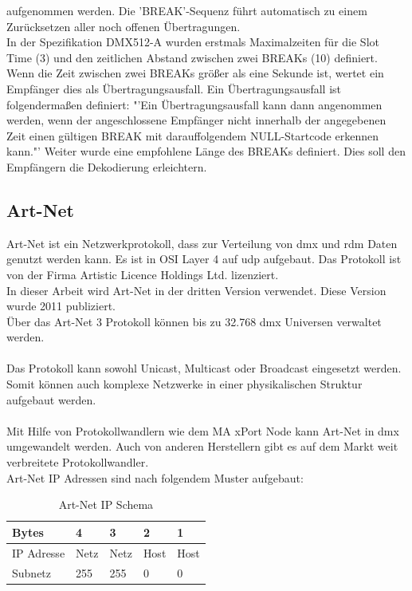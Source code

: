 \documentclass[11pt]{scrartcl}
\begin{document}
aufgenommen werden. Die 'BREAK'-Sequenz führt automatisch zu einem Zurücksetzen aller noch
offenen Übertragungen.\\
In der Spezifikation DMX512-A wurden erstmals Maximalzeiten für die Slot Time (3) und den
zeitlichen Abstand zwischen zwei BREAKs (10) definiert. Wenn die Zeit zwischen zwei BREAKs größer
als eine Sekunde ist, wertet ein Empfänger dies als Übertragungsausfall. Ein Übertragungsausfall ist
folgendermaßen definiert: "'Ein Übertragungsausfall kann dann angenommen werden, wenn der
angeschlossene Empfänger nicht innerhalb der angegebenen Zeit einen gültigen BREAK mit
darauffolgendem NULL-Startcode erkennen kann."' \cite{dmxstandard} Weiter wurde eine empfohlene Länge
des BREAKs definiert. Dies soll den Empfängern die Dekodierung erleichtern.
\clearpage

\subsection{Art-Net}
Art-Net ist ein Netzwerkprotokoll, dass zur Verteilung von \ac{dmx} und \ac{rdm} Daten genutzt werden kann.
Es ist in OSI Layer 4 auf \ac{udp} aufgebaut. Das Protokoll ist von der Firma Artistic Licence Holdings Ltd. lizenziert.\\
In dieser Arbeit wird Art-Net in der dritten Version verwendet. Diese Version wurde 2011 publiziert.\\
Über das Art-Net 3 Protokoll können bis zu 32.768 \ac{dmx} Universen verwaltet werden.\\
\cite{artnet}\\
Das Protokoll kann sowohl Unicast, Multicast oder Broadcast eingesetzt werden. Somit können auch komplexe Netzwerke
in einer physikalischen Struktur aufgebaut werden.\\
\\
Mit Hilfe von Protokollwandlern wie dem MA xPort Node kann Art-Net in \ac{dmx} umgewandelt werden. Auch von anderen
Herstellern gibt es auf dem Markt weit verbreitete Protokollwandler.\\
Art-Net IP Adressen sind nach folgendem Muster aufgebaut:
\begin{table}[H]
    \begin{tabularx}{\textwidth}{|X|X|X|X|X|}
        \hline Bytes & 4 & 3 & 2 & 1\\\hline
        IP Adresse & Netz & Netz & Host & Host\\\hline
        Subnetz & 255 & 255 & 0 & 0\\\hline
    \end{tabularx}
    \caption{Art-Net IP Schema}
\end{table}
\end{document}
